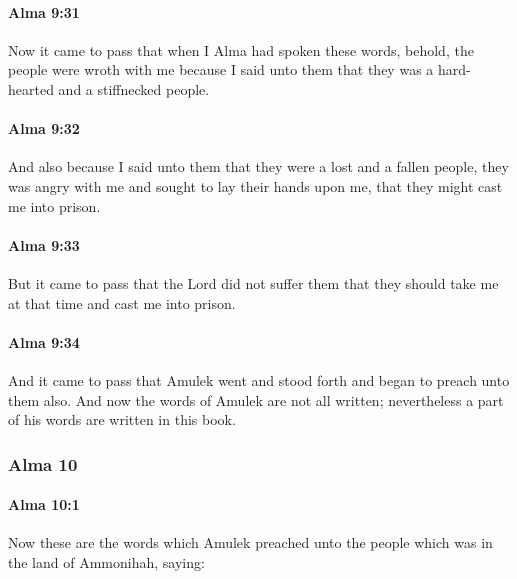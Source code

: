 		\paragraph{Alma 9:31} %
			\label{ALMA-9-31}

			Now it came to pass that when I Alma had spoken these words,
			behold, the people were wroth with me
			because I said unto them that they was a hard-hearted and a stiffnecked people.

		\paragraph{Alma 9:32} %
			\label{ALMA-9-32}

			And also because I said unto them that they were a lost and a fallen people,
			they was angry with me and sought to lay their hands upon me,
			that they might cast me into prison.

		\paragraph{Alma 9:33} %
			\label{ALMA-9-33}

			But it came to pass that the Lord did not suffer them
			that they should take me at that time and cast me into prison.

		\paragraph{Alma 9:34} %
			\label{ALMA-9-34}

			And it came to pass that Amulek went and stood forth
			and began to preach unto them also.
			And now the words of Amulek are not all written;
			nevertheless a part of his words are written in this book.

	\subsubsection{Alma 10} %
		\label{ALMA-10}
		
		\paragraph{Alma 10:1} %
			\label{ALMA-10-1}

			Now these are the words which Amulek preached unto the people
			which was in the land of Ammonihah, saying:


